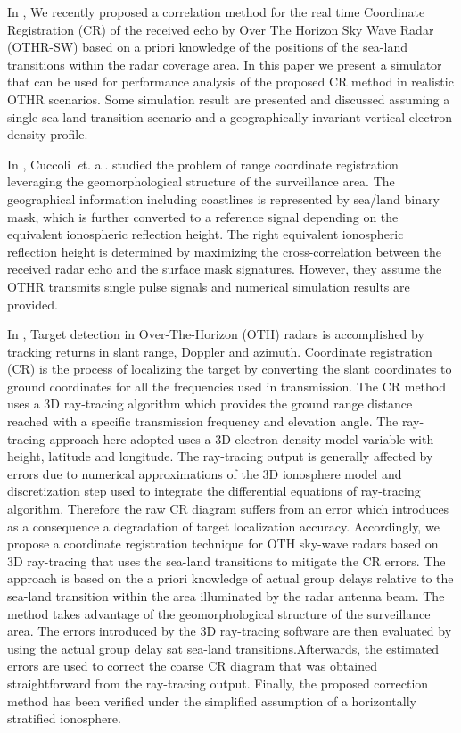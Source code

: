 In \cite{cuccoli2010sea}, We recently proposed a correlation method for the real time Coordinate Registration (CR) of the received echo by Over The Horizon Sky Wave Radar (OTHR-SW) based on a priori knowledge of the positions of the sea-land transitions within the radar coverage area. In this paper we present a simulator that can be used for performance analysis of the proposed CR method in realistic OTHR scenarios. Some simulation result are presented and discussed assuming a single sea-land transition scenario and a geographically invariant vertical electron density profile.

In \cite{cuccoli2011coordinate}, Cuccoli~{\emph et. al.} studied the problem of range coordinate registration leveraging the geomorphological structure of the surveillance area. The geographical information including coastlines is represented by sea/land binary mask, which is further converted to a reference signal depending on the equivalent ionospheric reflection height. The right equivalent ionospheric reflection height is determined by maximizing the cross-correlation between the received radar echo and the surface mask signatures. However, they assume the OTHR transmits single pulse signals and numerical simulation results are provided.

In \cite{cacciamano2012coordinate}, Target detection in Over-The-Horizon (OTH) radars is accomplished by tracking returns in slant range, Doppler and azimuth. Coordinate registration (CR) is the process of localizing the target by converting the slant coordinates to ground coordinates for all the frequencies used in transmission. The CR method uses a 3D ray-tracing algorithm which provides the ground range distance reached with a specific transmission frequency and elevation angle. The ray-tracing approach here adopted uses a 3D electron density model variable with height, latitude and longitude. The ray-tracing output is generally affected by errors due to numerical approximations of the 3D ionosphere model and discretization step used to integrate the differential equations of ray-tracing algorithm. Therefore the raw CR diagram suffers from an error which introduces as a consequence a degradation of target localization accuracy. Accordingly, we propose a coordinate registration technique for OTH sky-wave radars based on 3D ray-tracing that uses the sea-land transitions to mitigate the CR errors. The approach is based on the a priori knowledge of actual group delays relative to the sea-land transition within the area illuminated by the radar antenna beam. The method takes advantage of the geomorphological structure of the surveillance area. The errors introduced by the 3D ray-tracing software are then evaluated by using the actual group delay sat sea-land transitions.Afterwards, the estimated errors are used to correct the coarse CR diagram that was obtained straightforward from the ray-tracing output. Finally, the proposed correction method has been verified under the simplified assumption of a horizontally stratified ionosphere.

